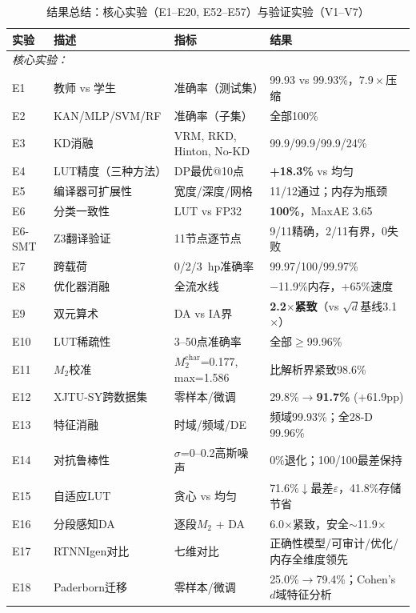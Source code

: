 \documentclass[journal,onecolumn]{IEEEtran}
\theoremstyle{definition}
\theoremstyle{plain}
\theoremstyle{remark}
\renewcommand{\arraystretch}{1.15}
\begin{document}
\begin{table}[tb]
\centering
\caption{结果总结：核心实验（E1--E20, E52--E57）与验证实验（V1--V7）}
\label{tab:summary}
\scriptsize
\renewcommand{\arraystretch}{0.95}
\begin{tabular}{@{}p{0.7cm}p{2.2cm}p{2.0cm}p{2.2cm}@{}}
\toprule
\textbf{实验} & \textbf{描述} & \textbf{指标} & \textbf{结果} \\
\midrule
\multicolumn{4}{l}{\textit{核心实验：}} \\
E1 & 教师 vs 学生    & 准确率（测试集） & 99.93 vs 99.93\%，$7.9\times$压缩 \\
E2 & KAN/MLP/SVM/RF        & 准确率（子集）  & 全部100\% \\
E3 & KD消融           & VRM, RKD, Hinton, No-KD & 99.9/99.9/99.9/24\% \\
E4 & LUT精度（三种方法） & DP最优@10点 & \textbf{+18.3\%} vs 均匀 \\
E5 & 编译器可扩展性  & 宽度/深度/网格 & 11/12通过；内存为瓶颈 \\
E6 & 分类一致性        & LUT vs FP32 & \textbf{100\%}，MaxAE 3.65 \\
E6-SMT & Z3翻译验证 & 11节点逐节点 & 9/11精确，2/11有界，0失败 \\
E7 & 跨载荷            & 0/2/3~hp准确率 & 99.97/100/99.97\% \\
E8 & 优化器消融    & 全流水线 & $-$11.9\%内存，+65\%速度 \\
E9 & 双元算术      & DA vs IA界 & \textbf{2.2$\times$紧致}（vs $\sqrt{d}$基线3.1$\times$） \\
E10& LUT稀疏性& 3--50点准确率 & 全部$\ge$99.96\% \\
E11& $M_2$校准      & $M_2^{\text{char}}$=0.177, max=1.586 & 比解析界紧致98.6\% \\
E12& XJTU-SY跨数据集 & 零样本/微调 & 29.8\%$\to$\textbf{91.7\%} (+61.9pp) \\
E13& 特征消融      & 时域/频域/DE    & 频域99.93\%；全28-D 99.96\% \\
E14& 对抗鲁棒性& $\sigma$=0--0.2高斯噪声 & 0\%退化；100/100最差保持 \\
E15& 自适应LUT & 贪心 vs 均匀  & 71.6\%$\downarrow$最差$\varepsilon$，41.8\%存储节省 \\
E16& 分段感知DA       & 逐段$M_2$ + DA       & 6.0$\times$紧致，安全$\sim$11.9$\times$ \\
E17& RTNNIgen对比 & 七维对比 & 正确性模型/可审计/优化/内存全维度领先 \\
E18& Paderborn迁移 & 零样本/微调 & 25.0\%$\to$79.4\%；Cohen's $d$域特征分析 \\

\end{tabular}
\end{table}
\end{document}
